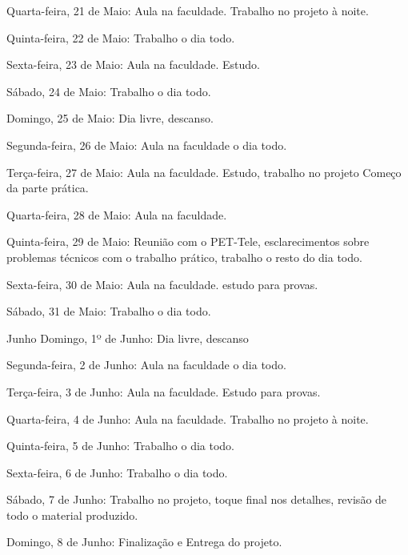 Quarta-feira, 21 de Maio: Aula na faculdade. Trabalho no projeto à noite.

Quinta-feira, 22 de Maio: Trabalho o dia todo.

Sexta-feira, 23 de Maio: Aula na faculdade. Estudo.

Sábado, 24 de Maio: Trabalho o dia todo.

Domingo, 25 de Maio: Dia livre, descanso.

Segunda-feira, 26 de Maio: Aula na faculdade o dia todo.

Terça-feira, 27 de Maio: Aula na faculdade. Estudo, trabalho no projeto Começo da parte prática.

Quarta-feira, 28 de Maio: Aula na faculdade.

Quinta-feira, 29 de Maio: Reunião com o PET-Tele, esclarecimentos sobre problemas técnicos com o trabalho prático, trabalho o resto do dia todo.

Sexta-feira, 30 de Maio: Aula na faculdade. estudo para provas.

Sábado, 31 de Maio: Trabalho o dia todo.

Junho
Domingo, 1º de Junho: Dia livre, descanso

Segunda-feira, 2 de Junho: Aula na faculdade o dia todo.

Terça-feira, 3 de Junho: Aula na faculdade. Estudo para provas.

Quarta-feira, 4 de Junho: Aula na faculdade. Trabalho no projeto à noite.

Quinta-feira, 5 de Junho: Trabalho o dia todo.

Sexta-feira, 6 de Junho: Trabalho o dia todo.

Sábado, 7 de Junho: Trabalho no projeto, toque final nos detalhes, revisão de todo o material produzido.

Domingo, 8 de Junho: Finalização e Entrega do projeto.